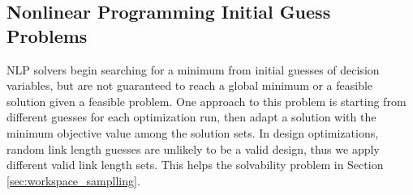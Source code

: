 \documentclass[letterpaper, 10 pt, conference]{ieeeconf}  %
\begin{document}


\subsection{Nonlinear Programming Initial Guess Problems \label{sec:initial_guess}}
NLP solvers begin searching for a minimum from initial guesses of decision variables, but are not guaranteed to reach a global minimum or a feasible solution given a feasible problem. One approach to this problem is starting from different guesses for each optimization run, then adapt a solution with the minimum objective value among the solution sets. In design optimizations, random link length guesses are unlikely to be a valid design, thus we apply different valid link length sets. %
This helps the solvability problem in Section \ref{sec:workspace_samplling}. 


\end{document}
